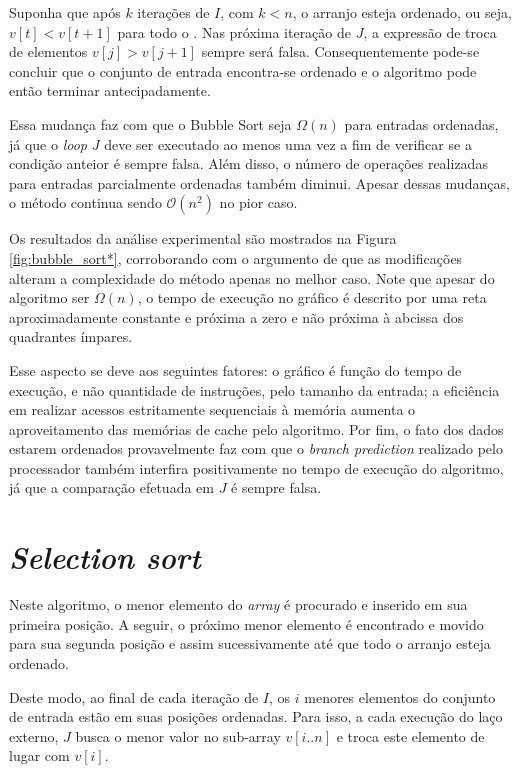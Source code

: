 \documentclass[12pt]{article}
\begin{document}
Suponha que após $k$ iterações de $I$, com $k<n$, o arranjo esteja ordenado, ou seja, $v[t] < v[t+1]$ para todo o . Nas próxima iteração de $J$, a expressão de troca de elementos $v[j] > v[j+1]$ sempre será falsa. Consequentemente pode-se concluir que o conjunto de entrada encontra-se ordenado e o algoritmo pode então terminar antecipadamente.

Essa mudança faz com que o Bubble Sort seja $\Omega(n)$ para entradas ordenadas, já que o \textit{loop} $J$ deve ser executado ao menos uma vez a fim de verificar se a condição anteior é sempre falsa. Além disso, o número de operações realizadas para entradas parcialmente ordenadas também diminui. Apesar dessas mudanças, o método continua sendo $\mathcal{O}(n^2)$ no pior caso.

Os resultados da análise experimental são mostrados na Figura \ref{fig:bubble_sort*}, corroborando com o argumento de que as modificações alteram a complexidade do método apenas no melhor caso. Note que apesar do algoritmo ser $\Omega(n)$, o tempo de execução no gráfico é descrito por uma reta aproximadamente constante e próxima a zero e não próxima à abcissa dos quadrantes ímpares.

Esse aspecto se deve aos seguintes fatores: o gráfico é função do tempo de execução, e não quantidade de instruções, pelo tamanho da entrada; a eficiência em realizar acessos estritamente sequenciais à memória aumenta o aproveitamento das memórias de cache pelo algoritmo. Por fim, o fato dos dados estarem ordenados provavelmente faz com que o \textit{branch prediction} realizado pelo processador também interfira positivamente no tempo de execução do algoritmo, já que a comparação efetuada em $J$ é sempre falsa.



\section{\textit{Selection sort}}

Neste algoritmo, o menor elemento do \textit{array} é procurado e inserido em sua primeira posição. A seguir, o próximo menor elemento é encontrado e movido para sua segunda posição e assim sucessivamente até que todo o arranjo esteja ordenado.

Deste modo, ao final de cada iteração de $I$, os $i$ menores elementos do conjunto de entrada estão em suas posições ordenadas. Para isso, a cada execução do laço externo, $J$ busca o menor valor no sub-array $v[i..n]$ e troca este elemento de lugar com $v[i]$.
\end{document}

